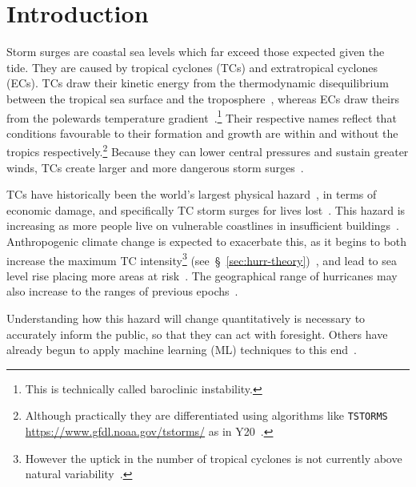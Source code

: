 \section{Introduction}
\label{sec:1_Introduction}


Storm surges are coastal sea levels which far exceed those
expected given the tide.
They are caused by tropical cyclones
(TCs) and extratropical cyclones (ECs).
TCs draw their kinetic energy from the thermodynamic disequilibrium between
the tropical sea surface and the troposphere~\cite{emanuel1986air, emanuel1987dependence},
whereas ECs draw theirs from the
polewards temperature gradient~\cite{lorenz1960energy, holton2004introduction}.\footnote{This is technically called baroclinic instability.}
Their respective names reflect that conditions favourable
to their formation and growth are within and without the tropics respectively.\footnote{
Although practically they are differentiated using algorithms like \texttt{TSTORMS}
\url{https://www.gfdl.noaa.gov/tstorms/} as in Y20~\cite{ZannaPreprint}.}
Because they can lower central pressures and sustain greater winds,
TCs create larger and more dangerous storm surges~\cite{emanuel2005divine}.

TCs have historically been the
world's largest physical hazard~\cite{shultz2005epidemiology},
in terms of economic damage, and specifically TC storm surges for lives lost~\cite{zhang2009tropical}.
This hazard is increasing as more people live on vulnerable coastlines
in insufficient buildings~\cite{emanuel2005divine}.
Anthropogenic climate change is expected to exacerbate this,
as it begins to both increase the maximum TC intensity\footnote{However the uptick
in the number of tropical cyclones is not currently above
 natural variability~\cite{mendelsohn2012impact}.}
(see~§~\ref{sec:hurr-theory})~\cite{emanuel2008hurricanes,emanuel2017will},
and lead to sea level rise placing more areas at risk~\cite{SROCC}.
The geographical range of hurricanes may also increase
to the ranges of previous epochs~\cite{fedorov2010tropical}.

Understanding how this hazard will change quantitatively
is necessary to accurately
inform the public,
so that they can act with foresight.
Others have already begun to apply machine learning (ML) techniques to this
end~\cite{kulp2019new, kulp2018coastaldem, tadesse2020data}.




